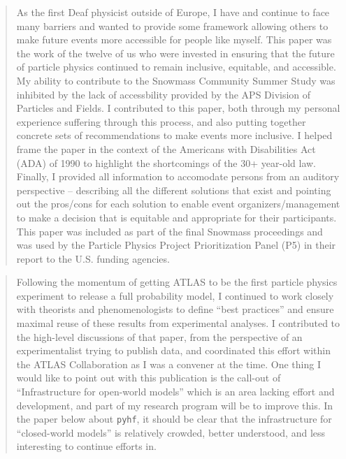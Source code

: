 \begin{quotation}
	As the first Deaf physicist outside of Europe, I have and continue to face many barriers and wanted to provide some framework allowing others to make future events more accessible for people like myself.
	This paper was the work of the twelve of us who were invested in ensuring that the future of particle physics continued to remain inclusive, equitable, and accessible.
	My ability to contribute to the Snowmass Community Summer Study was inhibited by the lack of accessbility provided by the APS Division of Particles and Fields.
	I contributed to this paper, both through my personal experience suffering through this process, and also putting together concrete sets of recommendations to make events more inclusive.
	I helped frame the paper in the context of the Americans with Disabilities Act (ADA) of 1990 to highlight the shortcomings of the 30+ year-old law.
	Finally, I provided all information to accomodate persons from an auditory perspective -- describing all the different solutions that exist and pointing out the pros/cons for each solution to enable event organizers/management to make a decision that is equitable and appropriate for their participants.
	This paper was included as part of the final Snowmass proceedings and was used by the Particle Physics Project Prioritization Panel (P5) in their report to the U.S. funding agencies.
\end{quotation}

\begin{quotation}
	Following the momentum of getting ATLAS to be the first particle physics experiment to release a full probability model, I continued to work closely with theorists and phenomenologists to define \enquote{best practices} and ensure maximal reuse of these results from experimental analyses.
	I contributed to the high-level discussions of that paper, from the perspective of an experimentalist trying to publish data, and coordinated this effort within the ATLAS Collaboration as I was a convener at the time.
	One thing I would like to point out with this publication is the call-out of \enquote{Infrastructure for open-world models} which is an area lacking effort and development, and part of my research program will be to improve this.
	In the paper below about \texttt{pyhf}, it should be clear that the infrastructure for \enquote{closed-world models} is relatively crowded, better understood, and less interesting to continue efforts in.
\end{quotation}

